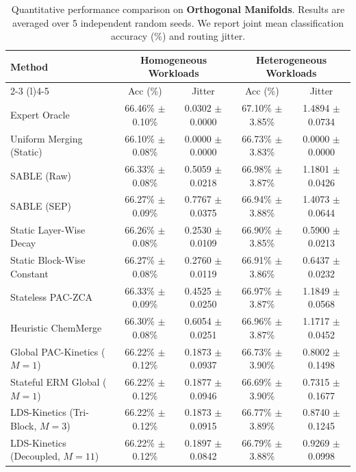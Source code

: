 \begin{table}[t]
\caption{Quantitative performance comparison on \textbf{Orthogonal Manifolds}. Results are averaged over 5 independent random seeds. We report joint mean classification accuracy (\%) and routing jitter.}
\label{tab:orthogonal_results}
\vskip 0.15in
\begin{center}
\begin{small}
\begin{sc}
\setlength{\tabcolsep}{4.5pt}
\begin{tabular}{lcccc}
\toprule
Method & \multicolumn{2}{c}{Homogeneous Workloads} & \multicolumn{2}{c}{Heterogeneous Workloads} \\
\cmidrule(r){2-3} \cmidrule(l){4-5}
& Acc (\%) & Jitter & Acc (\%) & Jitter \\
\midrule
Expert Oracle & 66.46\% $\pm$ 0.10\% & 0.0302 $\pm$ 0.0000 & 67.10\% $\pm$ 3.85\% & 1.4894 $\pm$ 0.0734 \\
Uniform Merging (Static) & 66.10\% $\pm$ 0.08\% & 0.0000 $\pm$ 0.0000 & 66.73\% $\pm$ 3.83\% & 0.0000 $\pm$ 0.0000 \\
\midrule
SABLE (Raw) & 66.33\% $\pm$ 0.08\% & 0.5059 $\pm$ 0.0218 & 66.98\% $\pm$ 3.87\% & 1.1801 $\pm$ 0.0426 \\
SABLE (SEP) & 66.27\% $\pm$ 0.09\% & 0.7767 $\pm$ 0.0375 & 66.94\% $\pm$ 3.88\% & 1.4073 $\pm$ 0.0644 \\
Static Layer-Wise Decay & 66.26\% $\pm$ 0.08\% & 0.2530 $\pm$ 0.0109 & 66.90\% $\pm$ 3.85\% & 0.5900 $\pm$ 0.0213 \\
Static Block-Wise Constant & 66.27\% $\pm$ 0.08\% & 0.2760 $\pm$ 0.0119 & 66.91\% $\pm$ 3.86\% & 0.6437 $\pm$ 0.0232 \\
Stateless PAC-ZCA & 66.33\% $\pm$ 0.09\% & 0.4525 $\pm$ 0.0250 & 66.97\% $\pm$ 3.87\% & 1.1849 $\pm$ 0.0568 \\
Heuristic ChemMerge & 66.30\% $\pm$ 0.08\% & 0.6054 $\pm$ 0.0251 & 66.96\% $\pm$ 3.87\% & 1.1717 $\pm$ 0.0452 \\
\midrule
Global PAC-Kinetics ($M=1$) & 66.22\% $\pm$ 0.12\% & 0.1873 $\pm$ 0.0937 & 66.73\% $\pm$ 3.90\% & 0.8002 $\pm$ 0.1498 \\
Stateful ERM Global ($M=1$) & 66.22\% $\pm$ 0.12\% & 0.1877 $\pm$ 0.0946 & 66.69\% $\pm$ 3.90\% & 0.7315 $\pm$ 0.1677 \\
\midrule
LDS-Kinetics (Tri-Block, $M=3$) & 66.22\% $\pm$ 0.12\% & 0.1873 $\pm$ 0.0915 & 66.77\% $\pm$ 3.89\% & 0.8740 $\pm$ 0.1245 \\
LDS-Kinetics (Decoupled, $M=11$) & 66.22\% $\pm$ 0.12\% & 0.1897 $\pm$ 0.0842 & 66.79\% $\pm$ 3.88\% & 0.9269 $\pm$ 0.0998 \\

\end{tabular}
\end{sc}
\end{small}
\end{center}
\end{table}
